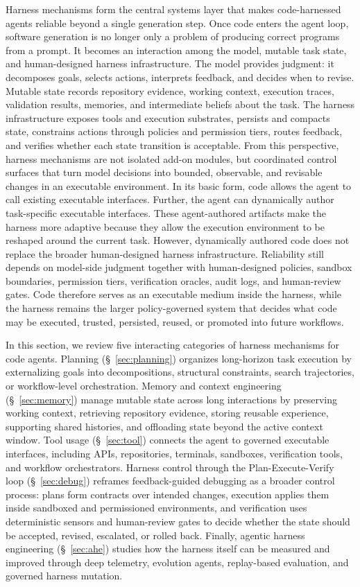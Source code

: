 \documentclass{llmxive}
\begin{document}
Harness mechanisms form the central systems layer that makes code-harnessed agents reliable beyond a
single generation step. Once code enters the agent loop, software generation is no longer only a problem of producing correct programs from a prompt. It becomes an interaction among the model, mutable task state, and human-designed harness infrastructure. The model provides judgment: it decomposes goals, selects actions, interprets feedback, and decides when to revise. Mutable state records repository evidence, working context, execution traces, validation results, memories, and intermediate beliefs about the task. The harness infrastructure exposes tools and execution substrates, persists and compacts state, constrains actions through policies and permission tiers, routes feedback, and verifies whether each state transition is acceptable. From this perspective, harness mechanisms are not isolated add-on modules, but coordinated control surfaces that turn model decisions into bounded, observable, and revisable changes in an executable environment.
In its basic form, code allows the agent to call existing executable interfaces. 
Further, the agent can dynamically author task-specific executable interfaces. These agent-authored artifacts make the harness more adaptive because they allow the execution environment to be reshaped around the current task. However, dynamically authored code does not replace the broader human-designed harness infrastructure. Reliability still depends on model-side judgment together with human-designed policies, sandbox boundaries, permission tiers, verification oracles, audit logs, and human-review gates. Code therefore serves as an executable medium inside the harness, while the harness remains the larger policy-governed system that decides what code may be executed, trusted, persisted, reused, or promoted into future workflows.

In this section, we review five interacting categories of harness mechanisms for code agents. Planning (\S~\ref{sec:planning}) organizes long-horizon task execution by externalizing goals into decompositions, structural constraints, search trajectories, or workflow-level orchestration. Memory and context engineering (\S~\ref{sec:memory}) manage mutable state across long interactions by preserving working context,
retrieving repository evidence, storing reusable experience, supporting shared histories, and offloading state beyond the active context window. Tool usage (\S~\ref{sec:tool}) connects the agent to governed executable interfaces, including APIs, repositories, terminals, sandboxes, verification tools, and workflow orchestrators. Harness control through the Plan-Execute-Verify loop (\S~\ref{sec:debug}) reframes feedback-guided debugging as a broader control process: plans form contracts over intended changes, execution applies them inside sandboxed and permissioned environments, and verification uses deterministic sensors and human-review gates to decide whether the state should be accepted, revised, escalated, or rolled back. Finally, agentic harness engineering (\S~\ref{sec:ahe}) studies how the harness itself can be measured and improved through deep telemetry, evolution agents, replay-based evaluation, and governed harness mutation.
\end{document}
